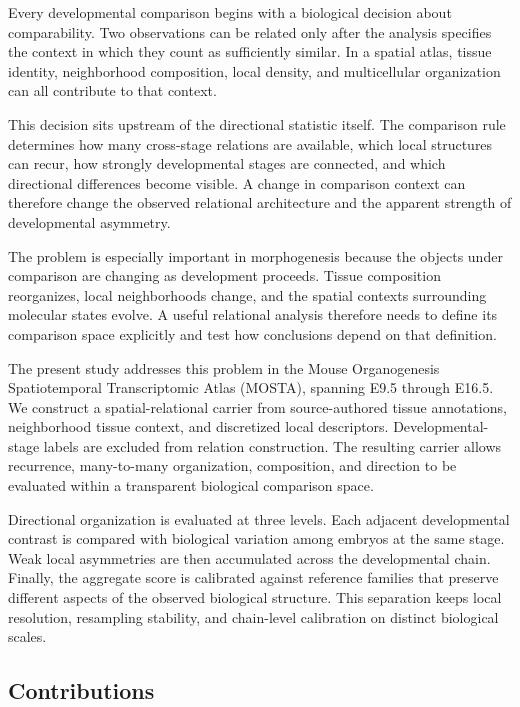 \documentclass[11pt]{article}
\begin{document}
Every developmental comparison begins with a biological decision about comparability. Two observations can be related only after the analysis specifies the context in which they count as sufficiently similar. In a spatial atlas, tissue identity, neighborhood composition, local density, and multicellular organization can all contribute to that context.

This decision sits upstream of the directional statistic itself. The comparison rule determines how many cross-stage relations are available, which local structures can recur, how strongly developmental stages are connected, and which directional differences become visible. A change in comparison context can therefore change the observed relational architecture and the apparent strength of developmental asymmetry.

The problem is especially important in morphogenesis because the objects under comparison are changing as development proceeds. Tissue composition reorganizes, local neighborhoods change, and the spatial contexts surrounding molecular states evolve. A useful relational analysis therefore needs to define its comparison space explicitly and test how conclusions depend on that definition.

The present study addresses this problem in the Mouse Organogenesis Spatiotemporal Transcriptomic Atlas (MOSTA), spanning E9.5 through E16.5. We construct a spatial-relational carrier from source-authored tissue annotations, neighborhood tissue context, and discretized local descriptors. Developmental-stage labels are excluded from relation construction. The resulting carrier allows recurrence, many-to-many organization, composition, and direction to be evaluated within a transparent biological comparison space.

Directional organization is evaluated at three levels. Each adjacent developmental contrast is compared with biological variation among embryos at the same stage. Weak local asymmetries are then accumulated across the developmental chain. Finally, the aggregate score is calibrated against reference families that preserve different aspects of the observed biological structure. This separation keeps local resolution, resampling stability, and chain-level calibration on distinct biological scales.

\subsection{Contributions}
\end{document}
